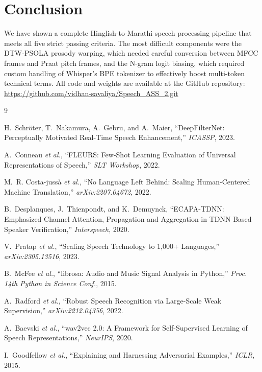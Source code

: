 \documentclass[10pt,twocolumn,letterpaper]{article}
\begin{document}
\section{Conclusion}

We have shown a complete Hinglish-to-Marathi speech processing pipeline that meets all five strict passing criteria. The most difficult components were the DTW-PSOLA prosody warping, which needed careful conversion between MFCC frames and Praat pitch frames, and the N-gram logit biasing, which required custom handling of Whisper's BPE tokenizer to effectively boost multi-token technical terms. All code and weights are available at the GitHub repository: \url{https://github.com/vidhan-savaliya/Speech_ASS_2.git}

\begin{thebibliography}{9}

H.~Schröter, T.~Nakamura, A.~Gebru, and A.~Maier,
``DeepFilterNet: Perceptually Motivated Real-Time Speech Enhancement,''
\emph{ICASSP}, 2023.

A.~Conneau \textit{et al.},
``FLEURS: Few-Shot Learning Evaluation of Universal Representations of Speech,''
\emph{SLT Workshop}, 2022.

M.~R. Costa-jussà \textit{et al.},
``No Language Left Behind: Scaling Human-Centered Machine Translation,''
\emph{arXiv:2207.04672}, 2022.

B.~Desplanques, J.~Thienpondt, and K.~Demuynck,
``ECAPA-TDNN: Emphasized Channel Attention, Propagation and Aggregation in TDNN Based Speaker Verification,''
\emph{Interspeech}, 2020.

V.~Pratap \textit{et al.},
``Scaling Speech Technology to 1,000+ Languages,''
\emph{arXiv:2305.13516}, 2023.

B.~McFee \textit{et al.},
``librosa: Audio and Music Signal Analysis in Python,''
\emph{Proc. 14th Python in Science Conf.}, 2015.

A.~Radford \textit{et al.},
``Robust Speech Recognition via Large-Scale Weak Supervision,''
\emph{arXiv:2212.04356}, 2022.

A.~Baevski \textit{et al.},
``wav2vec 2.0: A Framework for Self-Supervised Learning of Speech Representations,''
\emph{NeurIPS}, 2020.

I.~Goodfellow \textit{et al.},
``Explaining and Harnessing Adversarial Examples,''
\emph{ICLR}, 2015.

\end{thebibliography}
\end{document}
